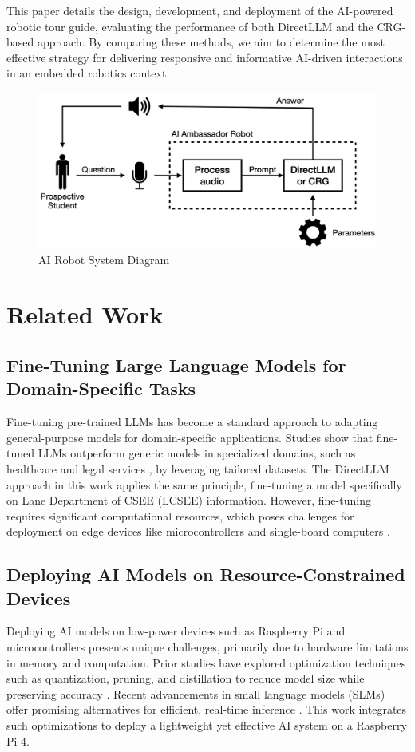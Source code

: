 \documentclass[conference]{IEEEtran}
\begin{document}
This paper details the design, development, and deployment of the AI-powered robotic tour guide, evaluating the performance of both DirectLLM and the CRG-based approach. 
By comparing these methods, we aim to determine the most effective strategy for delivering responsive and informative AI-driven interactions in an embedded robotics context.

\begin{figure}[t]
    \centering
    \includegraphics[width=0.70\linewidth]{assets/system_diagram.png}
    \caption{AI Robot System Diagram}
    \label{fig:system}
\end{figure}

\section{Related Work}
\subsection{Fine-Tuning Large Language Models for Domain-Specific Tasks}
Fine-tuning pre-trained LLMs has become a standard approach to adapting general-purpose models for domain-specific applications. 
Studies show that fine-tuned LLMs outperform generic models in specialized domains, such as healthcare and legal services \cite{b2}, by leveraging tailored datasets. 
The DirectLLM approach in this work applies the same principle, fine-tuning a model specifically on Lane Department of CSEE (LCSEE) information. 
However, fine-tuning requires significant computational resources, which poses challenges for deployment on edge devices like microcontrollers and single-board computers \cite{b3}.

\subsection{Deploying AI Models on Resource-Constrained Devices}
Deploying AI models on low-power devices such as Raspberry Pi and microcontrollers presents unique challenges, primarily due to hardware limitations in memory and computation. 
Prior studies have explored optimization techniques such as quantization, pruning, and distillation to reduce model size while preserving accuracy \cite{b4}. 
Recent advancements in small language models (SLMs) offer promising alternatives for efficient, real-time inference \cite{b5}. 
This work integrates such optimizations to deploy a lightweight yet effective AI system on a Raspberry Pi 4.
\end{document}
